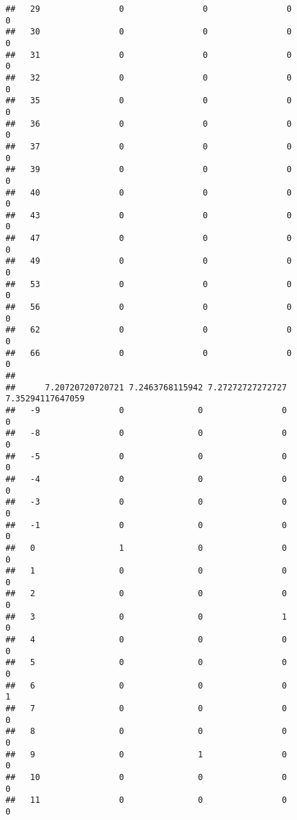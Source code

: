 \documentclass[]{article}
\begin{document}
\begin{verbatim}
##   29                0                0                0                0
##   30                0                0                0                0
##   31                0                0                0                0
##   32                0                0                0                0
##   35                0                0                0                0
##   36                0                0                0                0
##   37                0                0                0                0
##   39                0                0                0                0
##   40                0                0                0                0
##   43                0                0                0                0
##   47                0                0                0                0
##   49                0                0                0                0
##   53                0                0                0                0
##   56                0                0                0                0
##   62                0                0                0                0
##   66                0                0                0                0
##     
##      7.20720720720721 7.2463768115942 7.27272727272727 7.35294117647059
##   -9                0               0                0                0
##   -8                0               0                0                0
##   -5                0               0                0                0
##   -4                0               0                0                0
##   -3                0               0                0                0
##   -1                0               0                0                0
##   0                 1               0                0                0
##   1                 0               0                0                0
##   2                 0               0                0                0
##   3                 0               0                1                0
##   4                 0               0                0                0
##   5                 0               0                0                0
##   6                 0               0                0                1
##   7                 0               0                0                0
##   8                 0               0                0                0
##   9                 0               1                0                0
##   10                0               0                0                0
##   11                0               0                0                0

\end{verbatim}
\end{document}
